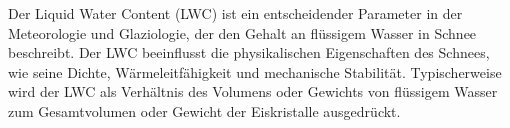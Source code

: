 Der Liquid Water Content (LWC) ist ein entscheidender Parameter in der Meteorologie und Glaziologie, der den Gehalt an flüssigem Wasser in Schnee beschreibt. Der LWC beeinflusst die physikalischen Eigenschaften des Schnees, wie seine Dichte, Wärmeleitfähigkeit und mechanische Stabilität. Typischerweise wird der LWC als Verhältnis des Volumens oder Gewichts von flüssigem Wasser zum Gesamtvolumen oder Gewicht der Eiskristalle ausgedrückt.
